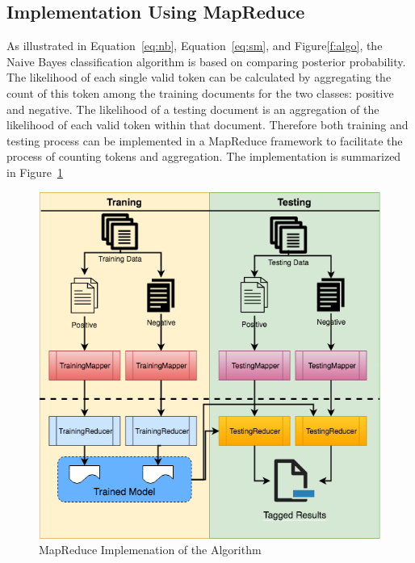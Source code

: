 \subsection{Implementation Using MapReduce}

As illustrated in Equation~\ref{eq:nb}, Equation~\ref{eq:sm}, and
Figure\ref{f:algo}, the Naive Bayes classification algorithm is based
on comparing posterior probability. The likelihood of each single
valid token can be calculated by aggregating the count of this token
among the training documents for the two classes: positive and
negative. The likelihood of a testing document is an aggregation
of the likelihood of each valid token within that document. Therefore
both training and testing process can be implemented in a MapReduce
framework to facilitate the process of counting tokens and
aggregation. The implementation is summarized in Figure~\ref{f:mapreduce}

\begin{figure}[!ht]
	\centering\includegraphics[width=\columnwidth]{images/mapreduce.png}
	\caption{MapReduce Implemenation of the Algorithm}\label{f:mapreduce}
\end{figure}

